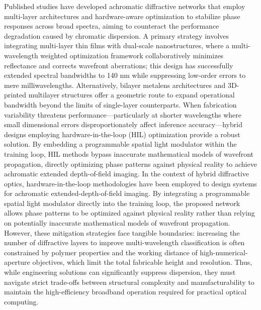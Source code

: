 Published studies have developed achromatic diffractive networks that employ multi-layer architectures and hardware-aware optimization to stabilize phase responses across broad spectra, aiming to counteract the performance degradation caused by chromatic dispersion. A primary strategy involves integrating multi-layer thin films with dual-scale nanostructures, where a multi-wavelength weighted optimization framework collaboratively minimizes reflectance and corrects wavefront aberrations; this design has successfully extended spectral bandwidths to 140 nm while suppressing low-order errors to mere milliwavelengths. Alternatively, bilayer metalens architectures and 3D-printed multilayer structures offer a geometric route to expand operational bandwidth beyond the limits of single-layer counterparts. When fabrication variability threatens performance---particularly at shorter wavelengths where small dimensional errors disproportionately affect inference accuracy---hybrid designs employing hardware-in-the-loop (HIL) optimization provide a robust solution. By embedding a programmable spatial light modulator within the training loop, HIL methods bypass inaccurate mathematical models of wavefront propagation, directly optimizing phase patterns against physical reality to achieve achromatic extended depth-of-field imaging. In the context of hybrid diffractive optics, hardware-in-the-loop methodologies have been employed to design systems for achromatic extended-depth-of-field imaging. By integrating a programmable spatial light modulator directly into the training loop, the proposed network allows phase patterns to be optimized against physical reality rather than relying on potentially inaccurate mathematical models of wavefront propagation. \citep{doi_10_1364_oe_461549_b2d41b3f} However, these mitigation strategies face tangible boundaries: increasing the number of diffractive layers to improve multi-wavelength classification is often constrained by polymer properties and the working distance of high-numerical-aperture objectives, which limit the total fabricable height and resolution. Thus, while engineering solutions can significantly suppress dispersion, they must navigate strict trade-offs between structural complexity and manufacturability to maintain the high-efficiency broadband operation required for practical optical computing. \citep{doi_10_1002_adpr_202300310_6647aa64} \citep{doi_10_3390_modelling7010029_9851fe61} \citep{doi_10_1364_oe_461549_b2d41b3f} \citep{doi_10_29026_oea_2021_200008_8948c2c3} \citep{doi_10_1126_sciadv_adj9262_15884f2e}

